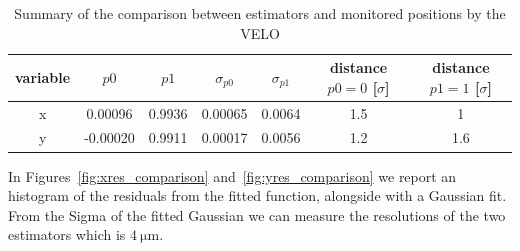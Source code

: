 \begin{table}
    \centering
    \begin{tabular}{c|c|c|c|c|c|c}
    variable  & $p0$ & $p1$ & $\sigma_{p0}$ & $\sigma_{p1}$ & distance $p0=0$ [$\sigma$] & distance $p1=1$ [$\sigma$]\\
    \hline
       x  & 0.00096 & 0.9936 & 0.00065 & 0.0064 & 1.5 & 1\\
       y  & -0.00020 & 0.9911 & 0.00017 & 0.0056 & 1.2 & 1.6 
    \end{tabular}
    \caption{Summary of the comparison between estimators and monitored positions by the VELO}
    \label{tab:summary}
\end{table}

In Figures~\ref{fig:xres_comparison} and~\ref{fig:yres_comparison} we report an histogram of the residuals from the fitted function, alongside with a Gaussian fit. From the Sigma of the fitted Gaussian we can measure the resolutions of the two estimators which is $\SI{4}{\micro\meter}$.

